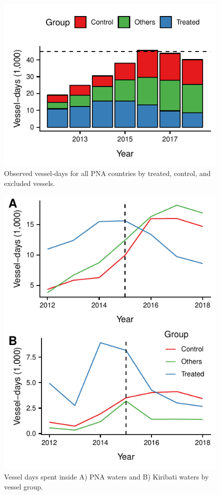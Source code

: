 \documentclass[9p,twocolumn,twoside,lineno]{pnas-new}
\begin{document}
\begin{figure}
\centering
	\includegraphics{img/all_PS_VDS_year.pdf}
	\caption{\label{fig:all_PS_VDS_year}Observed vessel-days for all PNA countries by treated, control, and excluded vessels.}
\end{figure}

\begin{figure}[H]
\centering
	\includegraphics{img/included_PS_VDS_year_DiD.pdf}
	\caption{\label{fig:included_PS_VDS_year_DiD}Vessel days spent inside A) PNA waters and B) Kiribati waters by vessel group.}
\end{figure}
\end{document}

